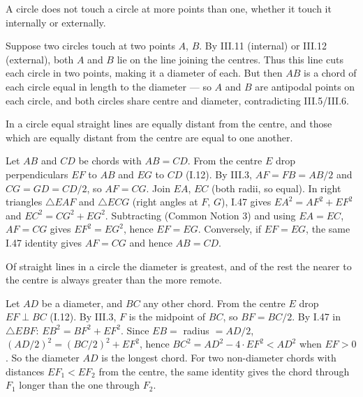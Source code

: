 \begin{claim}
\label{prop:III.13}
A circle does not touch a circle at more points than one, whether it
touch it internally or externally.
\end{claim}
\begin{evidence}
\label{ev:III.13}
Suppose two circles touch at two points $A$, $B$.  By III.11
(internal) or III.12 (external), both $A$ and $B$ lie on the line
joining the centres.  Thus this line cuts each circle in two
points, making it a diameter of each.  But then $AB$ is a chord of
each circle equal in length to the diameter --- so $A$ and $B$ are
antipodal points on each circle, and both circles share centre and
diameter, contradicting III.5/III.6.
\end{evidence}

\begin{claim}
\label{prop:III.14}
In a circle equal straight lines are equally distant from the centre,
and those which are equally distant from the centre are equal to one
another.
\end{claim}
\begin{evidence}
\label{ev:III.14}
Let $AB$ and $CD$ be chords with $AB = CD$.  From the centre $E$
drop perpendiculars $EF$ to $AB$ and $EG$ to $CD$ (I.12).  By III.3,
$AF = FB = AB/2$ and $CG = GD = CD/2$, so $AF = CG$.  Join $EA$,
$EC$ (both radii, so equal).  In right triangles $\triangle EAF$
and $\triangle ECG$ (right angles at $F$, $G$), I.47 gives $EA^2 =
AF^2 + EF^2$ and $EC^2 = CG^2 + EG^2$.  Subtracting (Common Notion
3) and using $EA = EC$, $AF = CG$ gives $EF^2 = EG^2$, hence $EF =
EG$.  Conversely, if $EF = EG$, the same I.47 identity gives $AF =
CG$ and hence $AB = CD$.
\end{evidence}

\begin{claim}
\label{prop:III.15}
Of straight lines in a circle the diameter is greatest, and of the
rest the nearer to the centre is always greater than the more remote.
\end{claim}
\begin{evidence}
\label{ev:III.15}
Let $AD$ be a diameter, and $BC$ any other chord.  From the centre
$E$ drop $EF \perp BC$ (I.12).  By III.3, $F$ is the midpoint of
$BC$, so $BF = BC/2$.  By I.47 in $\triangle EBF$: $EB^2 = BF^2 +
EF^2$.  Since $EB = $ radius $= AD/2$, $(AD/2)^2 = (BC/2)^2 +
EF^2$, hence $BC^2 = AD^2 - 4\cdot EF^2 < AD^2$ when $EF > 0$.  So
the diameter $AD$ is the longest chord.  For two non-diameter
chords with distances $EF_1 < EF_2$ from the centre, the same
identity gives the chord through $F_1$ longer than the one through
$F_2$.
\end{evidence}

